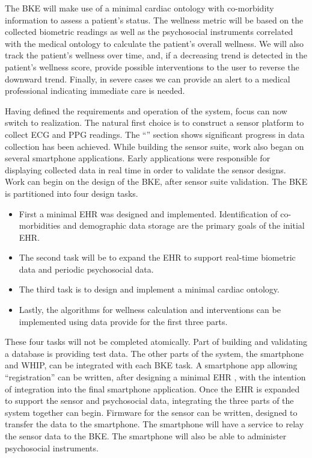 The BKE will make use of a minimal cardiac ontology with co-morbidity information to assess a patient's status. The wellness metric will be based on the collected biometric readings as well as the psychosocial instruments correlated with the medical ontology to calculate the patient's overall wellness. We will also track the patient's wellness over time, and, if a decreasing trend is detected in the patient's wellness score, provide possible interventions to the user to reverse the downward trend. Finally, in severe cases we can provide an alert to a medical professional indicating immediate care is needed.

Having defined the requirements and operation of the system, focus can now switch to realization. The natural first choice is to construct a sensor platform to collect ECG and PPG readings. The ``'' section shows significant progress in data collection has been achieved. While building the sensor suite, work also began on several smartphone applications. Early applications were responsible for displaying collected data in real time in order to validate the sensor designs. Work can begin on the design of the BKE, after sensor suite validation. The BKE is partitioned into four design tasks. 
\begin{itemize}
\item First a minimal EHR was designed and implemented. Identification of co-morbidities and demographic data storage are the primary goals of the initial EHR.
\item The second task will be to expand the EHR to support real-time biometric data and periodic psychosocial data. 
\item The third task is to design and implement a minimal cardiac ontology.
\item Lastly, the algorithms for wellness calculation and interventions can be implemented using data provide for the first three parts.
\end{itemize}
These four tasks will not be completed atomically. Part of building and validating a database is providing test data. The other parts of the system, the smartphone and WHIP, can be integrated with each BKE task. A smartphone app allowing “registration” can be written, after designing a minimal EHR , with the intention of integration into the final smartphone application. Once the EHR is expanded to support the sensor and psychosocial data, integrating the three parts of the system together can begin. Firmware for the sensor can be written, designed to transfer the data to the smartphone.  The smartphone will have a service to relay the sensor data to the BKE. The smartphone will also be able to administer psychosocial instruments. 
